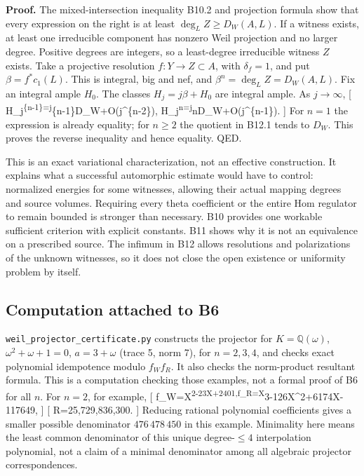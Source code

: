 \documentclass[11pt,a4paper]{article}
\theoremstyle{definition}
\begin{document}
\textbf{Proof.} The mixed-intersection inequality B10.2 and projection
formula show that every expression on the right is at least
\(\deg_L Z\ge D_W(A,L)\). If a witness exists, at least one irreducible
component has nonzero Weil projection and no larger degree. Positive
degrees are integers, so a least-degree irreducible witness \(Z\)
exists. Take a projective resolution \(f:Y\to Z\subset A\), with
\(\delta_f=1\), and put \(\beta=f^*c_1(L)\). This is integral, big and
nef, and \(\beta^n=\deg_L Z=D_W(A,L)\). Fix an integral ample \(H_0\).
The classes \(H_j=j\beta+H_0\) are integral ample. As \(j\to\infty\),
{[}
\beta H\_j\textsuperscript{\{n-1\}=j}\{n-1\}D\_W+O(j\^{}\{n-2\}),\qquad
H\_j\textsuperscript{n=j}nD\_W+O(j\^{}\{n-1\}). {]} For \(n=1\) the
expression is already equality; for \(n\ge2\) the quotient in B12.1
tends to \(D_W\). This proves the reverse inequality and hence equality.
QED.

This is an exact variational characterization, not an effective
construction. It explains what a successful automorphic estimate would
have to control: normalized energies for some witnesses, allowing their
actual mapping degrees and source volumes. Requiring every theta
coefficient or the entire Hom regulator to remain bounded is stronger
than necessary. B10 provides one workable sufficient criterion with
explicit constants. B11 shows why it is not an equivalence on a
prescribed source. The infimum in B12 allows resolutions and
polarizations of the unknown witnesses, so it does not close the open
existence or uniformity problem by itself.

\subsection{Computation attached to
B6}\label{computation-attached-to-b6}

\texttt{weil\_projector\_certificate.py} constructs the projector for
\(K=\mathbb Q(\omega)\), \(\omega^2+\omega+1=0\), \(a=3+\omega\) (trace
5, norm 7), for \(n=2,3,4\), and checks exact polynomial idempotence
modulo \(f_W f_R\). It also checks the norm-product resultant formula.
This is a computation checking those examples, not a formal proof of B6
for all \(n\). For \(n=2\), for example, {[}
f\_W=X\textsuperscript{2-23X+2401,\quad f\_R=X}3-126X\^{}2+6174X-117649,
{]} {[} R=25,729,836,300. {]} Reducing rational polynomial coefficients
gives a smaller possible denominator \(476\,478\,450\) in this example.
Minimality here means the least common denominator of this unique
degree-\(\leq4\) interpolation polynomial, not a claim of a minimal
denominator among all algebraic projector correspondences.
\end{document}
